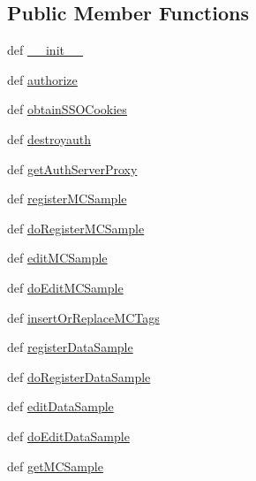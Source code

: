 \subsection*{Public Member Functions}
\begin{DoxyCompactItemize}
\item 
def \hyperlink{classaix3adb__deprecated_1_1aix3adb_ab3bdf22dfe34330aca36b68510fd7b85}{\-\_\-\-\_\-init\-\_\-\-\_\-}
\item 
def \hyperlink{classaix3adb__deprecated_1_1aix3adb_a490404ee7dfb72ba4884f2e3c060c10b}{authorize}
\item 
def \hyperlink{classaix3adb__deprecated_1_1aix3adb_a7d8886f97e6d6e390911b11f22189857}{obtain\-S\-S\-O\-Cookies}
\item 
def \hyperlink{classaix3adb__deprecated_1_1aix3adb_ade9b8034afdc23c640a64044a8c5028a}{destroyauth}
\item 
def \hyperlink{classaix3adb__deprecated_1_1aix3adb_a5561564b7bc878c3931757a86fc998c0}{get\-Auth\-Server\-Proxy}
\item 
def \hyperlink{classaix3adb__deprecated_1_1aix3adb_ad7871bd3d0b94d112e6a1a4422d4b877}{register\-M\-C\-Sample}
\item 
def \hyperlink{classaix3adb__deprecated_1_1aix3adb_a08a3fca51e520becce3ca68603959f0e}{do\-Register\-M\-C\-Sample}
\item 
def \hyperlink{classaix3adb__deprecated_1_1aix3adb_a490cbf5a8c97a75bff960e091efeb8e8}{edit\-M\-C\-Sample}
\item 
def \hyperlink{classaix3adb__deprecated_1_1aix3adb_ac88f8e3cf660a52ba67b179722a25f57}{do\-Edit\-M\-C\-Sample}
\item 
def \hyperlink{classaix3adb__deprecated_1_1aix3adb_a08a6cdde461fc3b6b9e2e188fee268e0}{insert\-Or\-Replace\-M\-C\-Tags}
\item 
def \hyperlink{classaix3adb__deprecated_1_1aix3adb_af21abd684c5b332f11f0d509d804fd40}{register\-Data\-Sample}
\item 
def \hyperlink{classaix3adb__deprecated_1_1aix3adb_a5d5d8818c2df751dabba566f4acdf399}{do\-Register\-Data\-Sample}
\item 
def \hyperlink{classaix3adb__deprecated_1_1aix3adb_ad30dfeecd2d84b0dcd07cb46746a0487}{edit\-Data\-Sample}
\item 
def \hyperlink{classaix3adb__deprecated_1_1aix3adb_abe0b6b9154799b9b7fbbee9a05f611f7}{do\-Edit\-Data\-Sample}
\item 
def \hyperlink{classaix3adb__deprecated_1_1aix3adb_a8f12d1a43ee470116b062f897290d4c6}{get\-M\-C\-Sample}

\end{DoxyCompactItemize}
